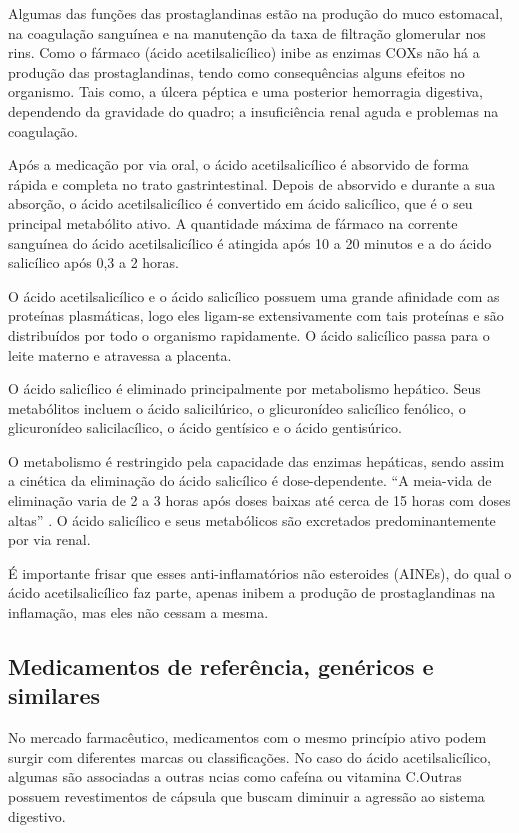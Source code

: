 Algumas das funções das prostaglandinas estão na produção do muco estomacal, na coagulação sanguínea e na
manutenção da taxa de filtração glomerular nos rins. Como o fármaco (ácido acetilsalicílico) inibe as
enzimas COXs não há a produção das prostaglandinas, tendo como consequências alguns efeitos no organismo.
Tais como, a úlcera péptica e uma posterior hemorragia digestiva, dependendo da gravidade do quadro; a
insuficiência renal aguda e problemas na coagulação. 

Após a medicação por via oral, o ácido acetilsalicílico é absorvido de forma rápida e completa no trato
gastrintestinal. Depois de absorvido e durante a sua absorção, o ácido acetilsalicílico é convertido em
ácido salicílico, que é o seu principal metabólito ativo. A quantidade máxima de fármaco na corrente
sanguínea do ácido acetilsalicílico é atingida após 10 a 20 minutos e a do ácido salicílico após 0,3 a 2
horas. 

O ácido acetilsalicílico e o ácido salicílico possuem uma grande afinidade com as proteínas plasmáticas,
logo eles ligam-se extensivamente com tais proteínas e são distribuídos por todo o organismo rapidamente.
O ácido salicílico passa para o leite materno e atravessa a placenta.

O ácido salicílico é eliminado principalmente por metabolismo hepático. Seus metabólitos incluem o ácido
salicilúrico, o glicuronídeo salicílico fenólico, o glicuronídeo salicilacílico, o ácido gentísico e o
ácido gentisúrico.

O metabolismo é restringido pela capacidade das enzimas hepáticas, sendo assim a cinética da eliminação
do ácido salicílico é dose-dependente. “A meia-vida de eliminação varia de 2 a 3 horas após doses baixas
até cerca de 15 horas com doses altas” \cite{bulaaspirina}. O ácido salicílico e seus metabólicos são
excretados predominantemente por via renal. 

É importante frisar que esses anti-inflamatórios não esteroides (AINEs), do qual o ácido acetilsalicílico
faz parte, apenas inibem a produção de prostaglandinas na inflamação, mas eles não cessam a mesma.

\subsection{Medicamentos de referência, genéricos e similares}\label{refgensim}

No mercado farmacêutico, medicamentos com o mesmo princípio ativo podem surgir com diferentes marcas ou
classificações. No caso do ácido acetilsalicílico, algumas são associadas a outras ncias como cafeína ou
vitamina C.Outras possuem revestimentos de cápsula que buscam diminuir a agressão ao sistema digestivo.
\cite{prade2006}

